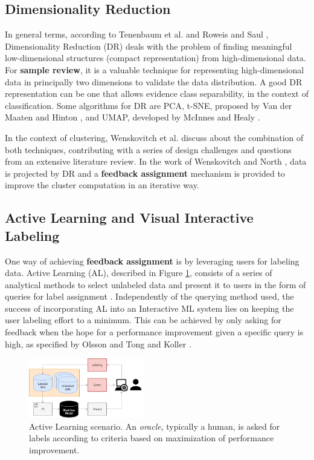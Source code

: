 \subsection{Dimensionality Reduction}
\label{subsec:dimred}

In general terms, according to Tenenbaum et al. \cite{Tenenbaum2000} and Roweis and Saul \cite{Roweis2000}, Dimensionality Reduction (DR) deals with the problem of finding meaningful low-dimensional structures (compact representation) from high-dimensional data. For \textbf{sample review}, it is a valuable technique for representing high-dimensional data in principally two dimensions to validate the data distribution. A good DR representation can be one that allows evidence class separability, in the context of classification. Some algorithms for DR are PCA, t-SNE, proposed by Van der Maaten and Hinton \cite{VanDerMaaten2008VisualizingT-sne}, and UMAP, developed by McInnes and Healy \cite{McInnes2018UMAP:Reduction}.

In the context of clustering, Wenskovitch et al. \cite{Wenskovitch2018TowardsAnalytics} discuss about the combination of both techniques, contributing with a series of design challenges and questions from an extensive literature review. In the work of Wenskovitch and North \cite{Wenskovitch2017Observation-LevelAlgorithms}, data is projected by DR and a \textbf{feedback assignment} mechanism is provided to improve the cluster computation in an iterative way.

\subsection{Active Learning and Visual Interactive Labeling}
\label{subsec:al-vil}

One way of achieving \textbf{feedback assignment} is by leveraging users for labeling data. Active Learning (AL), described in Figure \ref{fig:AL}, consists of a series of analytical methods to select unlabeled data and present it to users in the form of queries for label assignment \cite{Holzinger2016}. Independently of the querying method used, the success of incorporating AL into an Interactive ML system lies on keeping the user labeling effort to a minimum. This can be achieved by only asking for feedback when the hope for a performance improvement given a specific query is high, as specified by Olsson \cite{Olsson2009} and Tong and Koller \cite{Tong2001}.

\begin{figure}[ht]
 \centering
 \includegraphics[width=0.45\textwidth]{AL.png}
 \caption{Active Learning scenario. An \textit{oracle}, typically a human, is asked for labels according to criteria based on maximization of performance improvement.}
 \label{fig:AL}
\end{figure}

